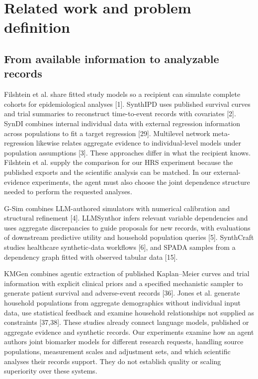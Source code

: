 \documentclass[11pt,letterpaper]{article}
\begin{document}
\section{Related work and problem definition}

\subsection{From available information to analyzable records}

Filshtein et al. share fitted study models so a recipient can simulate complete cohorts for epidemiological analyses [1]. SynthIPD uses published survival curves and trial summaries to reconstruct time-to-event records with covariates [2]. SynDI combines internal individual data with external regression information across populations to fit a target regression [29]. Multilevel network meta-regression likewise relates aggregate evidence to individual-level models under population assumptions [3]. These approaches differ in what the recipient knows. Filshtein et al. supply the comparison for our HRS experiment because the published exports and the scientific analysis can be matched. In our external-evidence experiments, the agent must also choose the joint dependence structure needed to perform the requested analyses.


G-Sim combines LLM-authored simulators with numerical calibration and structural refinement [4]. LLMSynthor infers relevant variable dependencies and uses aggregate discrepancies to guide proposals for new records, with evaluations of downstream predictive utility and household population queries [5]. SynthCraft studies healthcare synthetic-data workflows [6], and SPADA samples from a dependency graph fitted with observed tabular data [15].


KMGen combines agentic extraction of published Kaplan–\allowbreak{}Meier curves and trial information with explicit clinical priors and a specified mechanistic sampler to generate patient survival and adverse-event records [36]. Jones et al. generate household populations from aggregate demographics without individual input data, use statistical feedback and examine household relationships not supplied as constraints [37,38]. These studies already connect language models, published or aggregate evidence and synthetic records. Our experiments examine how an agent authors joint biomarker models for different research requests, handling source populations, measurement scales and adjustment sets, and which scientific analyses their records support. They do not establish quality or scaling superiority over these systems.
\end{document}
